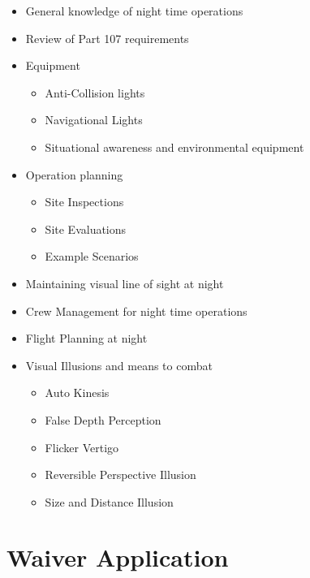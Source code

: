 \documentclass[
]{book}
\providecommand{\tightlist}{%
  \setlength{\itemsep}{0pt}\setlength{\parskip}{0pt}}
\begin{document}
\begin{itemize}
\item
  General knowledge of night time operations
\item
  Review of Part 107 requirements
\item
  Equipment

  \begin{itemize}
  \tightlist
  \item
    Anti-Collision lights
  \item
    Navigational Lights\\
  \item
    Situational awareness and environmental equipment
  \end{itemize}
\item
  Operation planning

  \begin{itemize}
  \tightlist
  \item
    Site Inspections
  \item
    Site Evaluations
  \item
    Example Scenarios
  \end{itemize}
\item
  Maintaining visual line of sight at night
\item
  Crew Management for night time operations
\item
  Flight Planning at night
\item
  Visual Illusions and means to combat

  \begin{itemize}
  \tightlist
  \item
    Auto Kinesis
  \item
    False Depth Perception
  \item
    Flicker Vertigo
  \item
    Reversible Perspective Illusion
  \item
    Size and Distance Illusion
  \end{itemize}
\end{itemize}

\hypertarget{s29-wa}{%
\section{Waiver Application}\label{s29-wa}}
\end{document}

